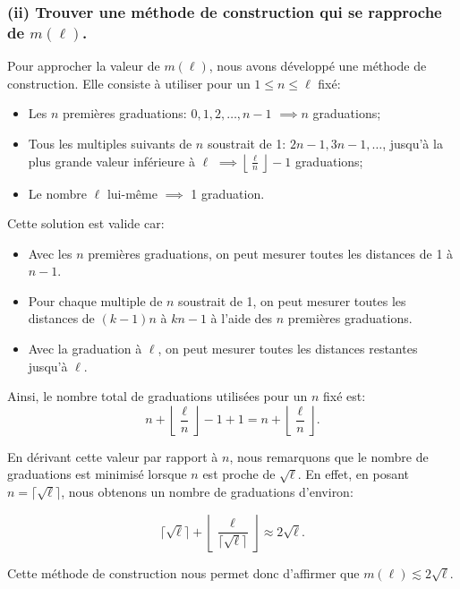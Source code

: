 \subsubsection*{(ii) Trouver une méthode de construction qui se rapproche de $m(\ell)$.}

Pour approcher la valeur de $m(\ell)$, nous avons développé une méthode de construction. Elle consiste à utiliser pour un $1 \leq n \leq \ell$ fixé:

\begin{itemize}
	\item Les $n$ premières graduations: $0, 1, 2, \ldots, n-1$ $\implies n$ graduations;
	\item Tous les multiples suivants de $n$ soustrait de 1: $2n-1, 3n-1, \ldots$, jusqu'à la plus grande valeur inférieure à $\ell$ $\implies \left\lfloor \frac{\ell}{n} \right\rfloor - 1$ graduations;
	\item Le nombre $\ell$ lui-même $\implies$ 1 graduation.
\end{itemize}

Cette solution est valide car:
\begin{itemize}
	\item Avec les $n$ premières graduations, on peut mesurer toutes les distances de 1 à $n-1$.
	\item Pour chaque multiple de $n$ soustrait de 1, on peut mesurer toutes les distances de $(k-1)n$ à $kn - 1$ à l'aide des $n$ premières graduations.
	\item Avec la graduation à $\ell$, on peut mesurer toutes les distances restantes jusqu'à $\ell$.
\end{itemize}

Ainsi, le nombre total de graduations utilisées pour un $n$ fixé est:
\[
n + \left\lfloor \frac{\ell}{n} \right\rfloor - 1 + 1 = n + \left\lfloor \frac{\ell}{n} \right\rfloor.
\]

En dérivant cette valeur par rapport à $n$, nous remarquons que le nombre de graduations est minimisé lorsque $n$ est proche de $\sqrt{\ell}$. En effet, en posant $n = \lceil \sqrt{\ell} \rceil$, nous obtenons un nombre de graduations d'environ:

\[
\lceil \sqrt{\ell} \rceil + \left\lfloor \frac{\ell}{\lceil \sqrt{\ell} \rceil} \right\rfloor \approx 2\sqrt{\ell}.
\]

Cette méthode de construction nous permet donc d'affirmer que $m(\ell) \lesssim 2\sqrt{\ell}$.